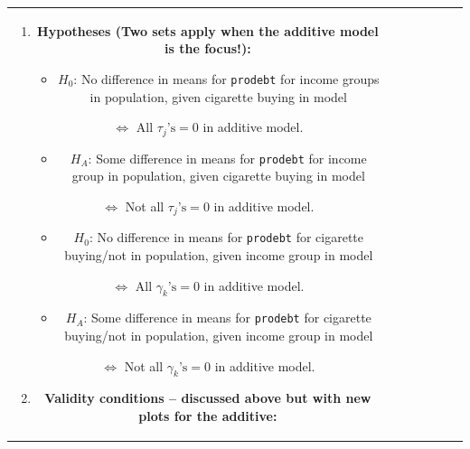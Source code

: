 \documentclass[]{book}
\newenvironment{Shaded}{\begin{snugshade}}{\end{snugshade}}
\providecommand{\tightlist}{%
  \setlength{\itemsep}{0pt}\setlength{\parskip}{0pt}}
\theoremstyle{definition}
\theoremstyle{definition}
\theoremstyle{remark}
\begin{document}
\begin{longtable}[]{@{}ccccccc@{}}
\begin{minipage}[b]{0.10\columnwidth}
\begin{Shaded}
\begin{Highlighting}[]
\begin{Shaded}
\begin{Highlighting}[]
\begin{Shaded}
\begin{Highlighting}[]
\begin{Shaded}
\begin{Highlighting}[]
\begin{Shaded}
\begin{Highlighting}[]
\begin{enumerate}
\def\labelenumi{\arabic{enumi}.}
\item
  \textbf{Hypotheses (Two sets apply when the additive model is the
  focus!):}

  \begin{itemize}
  \tightlist
  \item
    \(H_0\): No difference in means for \texttt{prodebt} for income
    groups in population, given cigarette buying in model
  \end{itemize}

  \(\Leftrightarrow\) All \(\tau_j\text{'s} = 0\) in additive model.

  \begin{itemize}
  \tightlist
  \item
    \(H_A\): Some difference in means for \texttt{prodebt} for income
    group in population, given cigarette buying in model
  \end{itemize}

  \(\Leftrightarrow\) Not all \(\tau_j\text{'s} = 0\) in additive model.

  \begin{itemize}
  \tightlist
  \item
    \(H_0\): No difference in means for \texttt{prodebt} for cigarette
    buying/not in population, given income group in model 
  \end{itemize}

  \(\Leftrightarrow\) All \(\gamma_k\text{'s} = 0\) in additive model.

  \begin{itemize}
  \tightlist
  \item
    \(H_A\): Some difference in means for \texttt{prodebt} for cigarette
    buying/not in population, given income group in model
  \end{itemize}

  \(\Leftrightarrow\) Not all \(\gamma_k\text{'s} = 0\) in additive
  model.
\item
  \textbf{Validity conditions -- discussed above but with new plots for
  the additive:}


\end{enumerate}
\end{Highlighting}
\end{Shaded}
\end{Highlighting}
\end{Shaded}
\end{Highlighting}
\end{Shaded}
\end{Highlighting}
\end{Shaded}
\end{Highlighting}
\end{Shaded}
\end{minipage}
\end{longtable}
\end{document}
